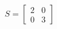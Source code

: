 \documentclass[preview]{standalone}
\begin{document}
\begin{align*}
S = \begin{bmatrix} 2 & 0 \\ 0 & 3 \end{bmatrix}
\end{align*}
\end{document}
